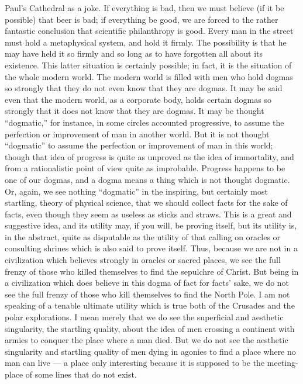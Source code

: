 Paul’s Cathedral as a joke. If everything is bad, then we must believe (if it be possible) that beer is bad; if everything be good, we are forced to the rather fantastic conclusion that scientific philanthropy is good. Every man in the street must hold a metaphysical system, and hold it firmly. The possibility is that he may have held it so firmly and so long as to have forgotten all about its existence. This latter situation is certainly possible; in fact, it is the situation of the whole modern world. The modern world is filled with men who hold dogmas so strongly that they do not even know that they are dogmas. It may be said even that the modern world, as a corporate body, holds certain dogmas so strongly that it does not know that they are dogmas. It may be thought “dogmatic,” for instance, in some circles accounted progressive, to assume the perfection or improvement of man in another world. But it is not thought “dogmatic” to assume the perfection or improvement of man in this world; though that idea of progress is quite as unproved as the idea of immortality, and from a rationalistic point of view quite as improbable. Progress happens to be one of our dogmas, and a dogma means a thing which is not thought dogmatic. Or, again, we see nothing “dogmatic” in the inspiring, but certainly most startling, theory of physical science, that we should collect facts for the sake of facts, even though they seem as useless as sticks and straws. This is a great and suggestive idea, and its utility may, if you will, be proving itself, but its utility is, in the abstract, quite as disputable as the utility of that calling on oracles or consulting shrines which is also said to prove itself. Thus, because we are not in a civilization which believes strongly in oracles or sacred places, we see the full frenzy of those who killed themselves to find the sepulchre of Christ. But being in a civilization which does believe in this dogma of fact for facts’ sake, we do not see the full frenzy of those who kill themselves to find the North Pole. I am not speaking of a tenable ultimate utility which is true both of the Crusades and the polar explorations. I mean merely that we do see the superficial and aesthetic singularity, the startling quality, about the idea of men crossing a continent with armies to conquer the place where a man died. But we do not see the aesthetic singularity and startling quality of men dying in agonies to find a place where no man can live — a place only interesting because it is supposed to be the meeting-place of some lines that do not exist.

